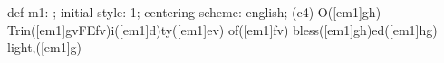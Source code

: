 def-m1: \grealign;
initial-style: 1;
centering-scheme: english;
(c4) O([em1]gh) Trin([em1]gvFEfv)i([em1]d)ty([em1]ev) of([em1]fv) bless([em1]gh)ed([em1]hg) light,([em1]g)